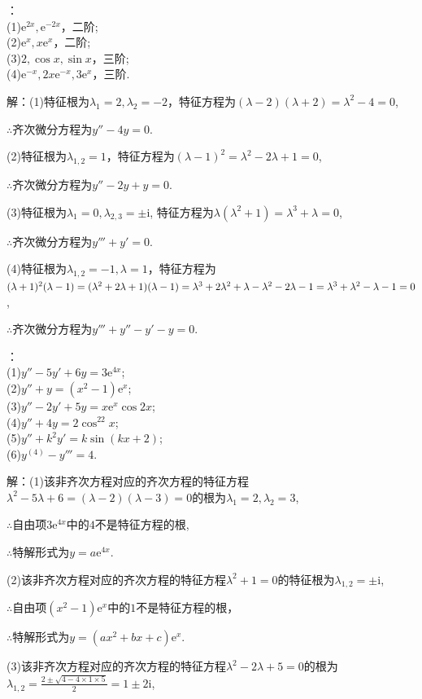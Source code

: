 \documentclass[12pt,UTF8,fleqn]{ctexart}
\newcommand{\me}[0]{\mathrm e}
\newcommand{\m}[0]{\mathrm }
\begin{document}
\begin{enumerate}
：\\
(1)$\me^{2x},\me^{-2x}$，二阶;\\
(2)$\me^x,x\me^x$，二阶;\\
(3)$2,\cos x,\sin  x$，三阶;\\
(4)$\me^{-x},2x\me^{-x},3\me^x$，三阶.

解：(1)特征根为$\lambda_1=2,\lambda_2=-2$，特征方程为$(\lambda-2)(\lambda+2)=\lambda^2-4=0$,

$\therefore$齐次微分方程为$y''-4y=0$.

(2)特征根为$\lambda_{1,2}=1$，特征方程为$(\lambda-1)^2=\lambda^2-2\lambda+1=0$,

$\therefore$齐次微分方程为$y''-2y+y=0$.

(3)特征根为$\lambda_1=0,\lambda_{2,3}=\pm\m i$, 特征方程为$\lambda(\lambda^2+1)=\lambda^3+\lambda=0$,

$\therefore$齐次微分方程为$y'''+y'=0$.

(4)特征根为$\lambda_{1,2}=-1,\lambda=1$，特征方程为$(\lambda+1)^2(\lambda-1)=(\lambda^2+2\lambda+1)(\lambda-1)\\
=\lambda^3+2\lambda^2+\lambda-\lambda^2-2\lambda-1=\lambda^3+\lambda^2-\lambda-1=0$,

$\therefore$齐次微分方程为$y'''+y''-y'-y=0$.

：\\
(1)$y''-5y'+6y=3\me^{4x}$;\\
(2)$y''+y=(x^2-1)\me^x$;\\
(3)$y''-2y'+5y=x\me^x\cos2x$;\\
(4)$y''+4y=2\cos^22x$;\\
(5)$y''+k^2y'=k\sin(kx+2)$;\\
(6)$y^{(4)}-y'''=4$.

解：(1)该非齐次方程对应的齐次方程的特征方程$\lambda^2-5\lambda+6=(\lambda-2)(\lambda-3)=0$的根为$\lambda_1=2,\lambda_2=3$,

$\therefore$自由项$3\me^{4x}$中的$4$不是特征方程的根,

$\therefore$特解形式为$y=a\me^{4x}$.

(2)该非齐次方程对应的齐次方程的特征方程$\lambda^2+1=0$的特征根为$\lambda_{1,2}=\pm\m i$,

$\therefore$自由项$(x^2-1)\me^x$中的$1$不是特征方程的根，

$\therefore$特解形式为$y=(ax^2+bx+c)\me^x$.

(3)该非齐次方程对应的齐次方程的特征方程$\lambda^2-2\lambda+5=0$的根为$\lambda_{1,2}=\frac{2\pm\sqrt{4-4\times1\times5}}2=1\pm2\m i$,


\end{enumerate}
\end{document}
